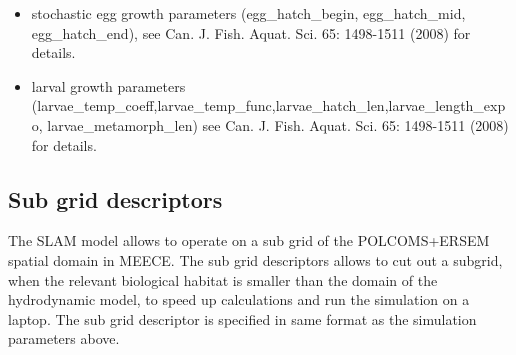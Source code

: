 \begin{itemize}
\item stochastic egg growth parameters (egg\_hatch\_begin, egg\_hatch\_mid, egg\_hatch\_end), see 
      Can. J. Fish. Aquat. Sci. 65: 1498-1511 (2008) for details.

\item larval growth parameters 
      (larvae\_temp\_coeff,larvae\_temp\_func,larvae\_hatch\_len,larvae\_length\_expo,
       larvae\_metamorph\_len) see 
      Can. J. Fish. Aquat. Sci. 65: 1498-1511 (2008) for details.
\end{itemize}


\subsection{Sub grid descriptors}

The SLAM model allows to operate on a sub grid of the POLCOMS+ERSEM spatial domain
in MEECE. The sub grid descriptors allows to cut out a subgrid, when the relevant biological
habitat is smaller than the domain of the hydrodynamic model, to speed up calculations and 
run the simulation on a laptop. The sub grid descriptor is specified in same format as the 
simulation parameters above.


